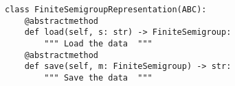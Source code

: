 \par\begin{minipage}{60ex}
\begin{verbatim}
class FiniteSemigroupRepresentation(ABC):
    @abstractmethod
    def load(self, s: str) -> FiniteSemigroup:
        """ Load the data  """
    @abstractmethod
    def save(self, m: FiniteSemigroup) -> str:
        """ Save the data  """
\end{verbatim}
\end{minipage}\par